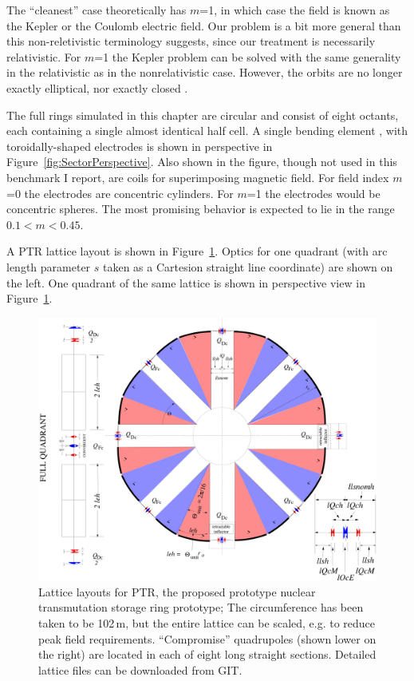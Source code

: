 \documentclass[12pt]{article}
\begin{document}
The ``cleanest'' case theoretically has $m$=1, in which case the field is known
as the Kepler or the Coulomb electric field. Our problem is a
bit more general than this non-reletivistic terminology suggests, since our
treatment is necessarily relativistic. For $m$=1 the
Kepler problem can be solved with the same generality
in the relativistic as in the nonrelativistic case.  However,  the
orbits are no longer exactly elliptical, nor exactly closed
\cite{Munoz}.

The full rings simulated in this chapter are circular and consist of eight octants,
each containing a single almost  identical  half cell.  A single bending element , with toroidally-shaped 
electrodes is shown in perspective in Figure~\ref{fig:SectorPerspective}.  Also shown in the figure, though 
not used in this benchmark I report, are coils for superimposing  magnetic field.  For field index $m$=0 the 
electrodes are concentric cylinders.  For $m$=1 the electrodes would be concentric spheres.  The most 
promising behavior is expected to lie in the range $0.1<m<0.45$.  

A PTR lattice layout is shown in Figure~\ref{fig:PTR-layout-Toroidal8_102p2-mod}.
Optics for one quadrant (with arc length parameter $s$ taken as a Cartesion straight
line coordinate) are shown on the left.  One quadrant of the same lattice is shown 
in perspective view in Figure~\ref{fig:PTR-layout-Toroidal8_102p2-mod}. 

\clearpage

%
\vskip -1cm
\begin{figure}
\centering
\includegraphics[scale=0.26]{pdf/PTR-layout-Toroidal8_102p2-mod.pdf}
\caption{\label{fig:PTR-layout-Toroidal8_102p2-mod}
Lattice layouts for PTR, the proposed prototype nuclear transmutation storage ring prototype;
The circumference has been taken to be 102\,m, but the entire lattice can be scaled, e.g. to 
reduce peak field requirements.  ``Compromise'' quadrupoles (shown lower on the right) are
located in each of eight long straight sections.  Detailed lattice files can be downloaded from GIT.
}
\end{figure}
%
\end{document}
